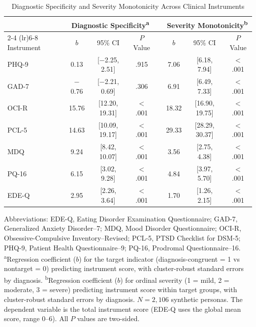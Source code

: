 \documentclass[10pt]{article}
\begin{document}
\begin{table}[ht]
\caption{Diagnostic Specificity and Severity Monotonicity Across Clinical Instruments}
\label{tab:main-effects}
\centering
\small
\begin{tabular}{lccccccc}
\toprule
 & \multicolumn{3}{c}{Diagnostic Specificity\textsuperscript{a}} & & \multicolumn{3}{c}{Severity Monotonicity\textsuperscript{b}} \\
\cmidrule(lr){2-4} \cmidrule(lr){6-8}
Instrument & $b$ & 95\% CI & $P$ Value & & $b$ & 95\% CI & $P$ Value \\
\midrule
PHQ-9  & 0.13  & [$-$2.25, 2.51]  & .915 & & 7.06  & [6.18, 7.94]  & $<$.001 \\
GAD-7  & $-$0.76 & [$-$2.21, 0.69] & .306 & & 6.91  & [6.49, 7.33]  & $<$.001 \\
OCI-R  & 15.76 & [12.20, 19.31]  & $<$.001 & & 18.32 & [16.90, 19.75] & $<$.001 \\
PCL-5  & 14.63 & [10.09, 19.17]  & $<$.001 & & 29.33 & [28.29, 30.37] & $<$.001 \\
MDQ    & 9.24  & [8.42, 10.07]   & $<$.001 & & 3.56  & [2.75, 4.38]  & $<$.001 \\
PQ-16  & 6.15  & [3.02, 9.28]    & $<$.001 & & 4.84  & [3.97, 5.70]  & $<$.001 \\
EDE-Q  & 2.95  & [2.26, 3.64]    & $<$.001 & & 1.70  & [1.26, 2.15]  & $<$.001 \\
\bottomrule
\end{tabular}
\begin{flushleft}
\footnotesize
Abbreviations: EDE-Q, Eating Disorder Examination Questionnaire; GAD-7, Generalized Anxiety Disorder--7; MDQ, Mood Disorder Questionnaire; OCI-R, Obsessive-Compulsive Inventory--Revised; PCL-5, PTSD Checklist for DSM-5; PHQ-9, Patient Health Questionnaire--9; PQ-16, Prodromal Questionnaire--16.
\textsuperscript{a}Regression coefficient ($b$) for the target indicator (diagnosis-congruent = 1 vs nontarget = 0) predicting instrument score, with cluster-robust standard errors by diagnosis.
\textsuperscript{b}Regression coefficient ($b$) for ordinal severity (1 = mild, 2 = moderate, 3 = severe) predicting instrument score within target groups, with cluster-robust standard errors by diagnosis. $N = 2{,}106$ synthetic personas. The dependent variable is the total instrument score (EDE-Q uses the global mean score, range 0--6). All $P$ values are two-sided.
\end{flushleft}
\end{table}

\end{document}
